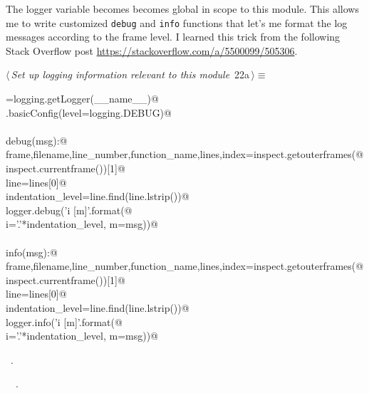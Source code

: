 \documentclass[11.5pt]{report}
\begin{document}
\vspace{-0.8cm}\newchunk The logger variable becomes becomes global in scope to this module. This allows
me to write customized \texttt{debug} and \texttt{info} functions that let's me format 
the log messages according to the frame level. I learned this trick from the following 
Stack Overflow post \url{https://stackoverflow.com/a/5500099/505306}. 
\begin{flushleft} \small
\begin{minipage}{\linewidth}\label{scrap24}\raggedright\small
{} $\langle\,${\itshape Set up logging information relevant to this module}\nobreak\ {\footnotesize {22a}}$\,\rangle\equiv$
\vspace{-1ex}
\begin{list}{}{} \item
\mbox{}\verb@logger=logging.getLogger(__name__)@\\
\mbox{}\verb@logging.basicConfig(level=logging.DEBUG)@\\
\mbox{}\verb@@\\
\mbox{}\verb@def debug(msg):@\\
\mbox{}\verb@    frame,filename,line_number,function_name,lines,index=inspect.getouterframes(@\\
\mbox{}\verb@        inspect.currentframe())[1]@\\
\mbox{}\verb@    line=lines[0]@\\
\mbox{}\verb@    indentation_level=line.find(line.lstrip())@\\
\mbox{}\verb@    logger.debug('{i} [{m}]'.format(@\\
\mbox{}\verb@        i='.'*indentation_level, m=msg))@\\
\mbox{}\verb@@\\
\mbox{}\verb@def info(msg):@\\
\mbox{}\verb@    frame,filename,line_number,function_name,lines,index=inspect.getouterframes(@\\
\mbox{}\verb@        inspect.currentframe())[1]@\\
\mbox{}\verb@    line=lines[0]@\\
\mbox{}\verb@    indentation_level=line.find(line.lstrip())@\\
\mbox{}\verb@    logger.info('{i} [{m}]'.format(@\\
\mbox{}\verb@        i='.'*indentation_level, m=msg))@\\
\mbox{}\verb@@{\NWsep}
\end{list}
\vspace{-1.5ex}
\footnotesize
\begin{list}{}{\setlength{\itemsep}{-\parsep}\setlength{\itemindent}{-\leftmargin}}
\item \NWtxtMacroRefIn\ .
\item \NWtxtIdentsUsed\nobreak\  \verb@logger@\nobreak\ .
\item{}
\end{list}
\end{minipage}\vspace{4ex}
\end{flushleft}
\end{document}
